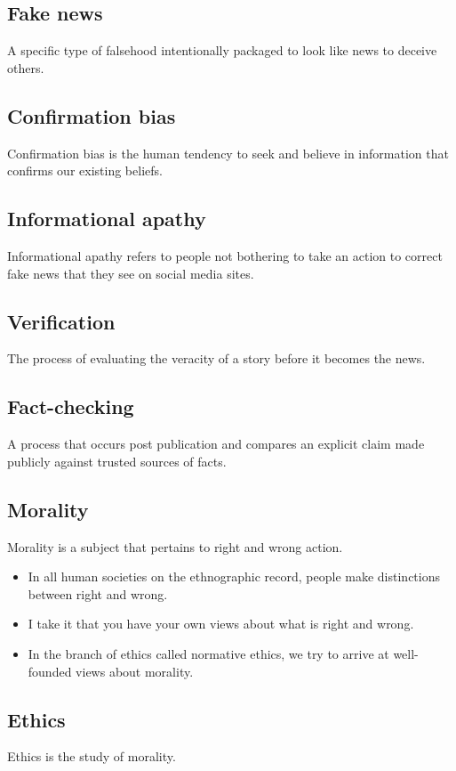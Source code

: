 \documentclass[11pt]{article}
\begin{document}
\subsection{Fake news}
\label{sec:org3469fd0}
A specific type of falsehood intentionally packaged to look like news to deceive others.
\subsection{Confirmation bias}
\label{sec:org3ae1e71}
Confirmation bias is the human tendency to seek and believe in information that confirms our existing beliefs.
\subsection{Informational apathy}
\label{sec:org54e193d}
Informational apathy refers to people not bothering to take an action to correct fake news that they see on social media sites.
\subsection{Verification}
\label{sec:org4824607}
The process of evaluating the veracity of a story before it becomes the news.
\subsection{Fact-checking}
\label{sec:org3486fe8}
A process that occurs post publication and compares an explicit claim made publicly against trusted sources of facts.
\subsection{Morality}
\label{sec:orgfd3eb84}
Morality is a subject that pertains to right and wrong action.
\begin{itemize}
\item In all human societies on the ethnographic record, people make distinctions between right and wrong.
\item I take it that you have your own views about what is right and wrong.
\item In the branch of ethics called normative ethics, we try to arrive at well-founded views about morality.
\end{itemize}
\subsection{Ethics}
\label{sec:orgf8dac31}
Ethics is the study of morality.
\end{document}

